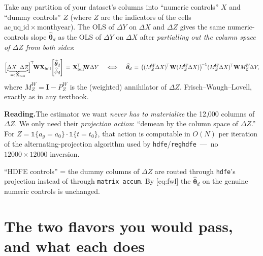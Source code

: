 \documentclass[11pt]{article}
\newcommand{\code}[1]{\texttt{\small #1}}
\newcommand{\1}{\mathbb{1}}
\newcommand{\thetad}{\widehat{\bm{\theta}}_d}
\newcommand{\Pproj}{P^{\!W}}
\newcommand{\Mproj}{M^{\!W}}
\begin{document}
Take any partition of your dataset's columns into ``numeric controls'' $X$
and ``dummy controls'' $Z$ (where $Z$ are the indicators of the cells
$\mathrm{ac\_uq\_id}\times \mathrm{monthyear}$). The OLS of $\Delta Y$ on
$\Delta X$ and $\Delta Z$ gives the same numeric-controls slope $\thetad$ as
the OLS of $\Delta Y$ on $\Delta X$ after \emph{partialling out the column
space of $\Delta Z$ from both sides}:

\begin{equation}
\Bigl[\underbrace{\Delta X\;\;\Delta Z}_{=:\,\mathbf{X}_{\text{full}}}\Bigr]^{\!\top}\!
\mathbf{W}
\mathbf{X}_{\text{full}}\!
\begin{bmatrix}\thetad \\ \widehat{\phi}_d\end{bmatrix}
\,=\, \mathbf{X}_{\text{full}}^{\!\top}\!\mathbf{W}\Delta Y
\quad\iff\quad
\thetad \,=\, \bigl((\Mproj_{Z}\!\Delta X)^{\!\top}\mathbf{W}(\Mproj_{Z}\!\Delta X)\bigr)^{\!-1}
(\Mproj_{Z}\!\Delta X)^{\!\top}\mathbf{W}\Mproj_{Z}\!\Delta Y,
\label{eq:fwl}
\end{equation}
where $\Mproj_{Z} = \mathbf{I} - \Pproj_Z$ is the (weighted) annihilator of
$\Delta Z$. Frisch--Waugh--Lovell, exactly as in any textbook.

\medskip\noindent
\textbf{Reading.}\;The estimator we want \emph{never has to materialize}
the 12{,}000 columns of $\Delta Z$. We only need their \emph{projection
action}: ``demean by the column space of $\Delta Z$.'' For
$Z = \1\{a_g = a_0\}\cdot \1\{t = t_0\}$, that action is computable in
$O(N)$ per iteration of the alternating-projection algorithm used by
\code{hdfe}/\code{reghdfe} \,---\, no $12000\times 12000$ inversion.

\begin{tcolorbox}[colback=codebg, colframe=ok, boxrule=0.6pt, arc=1pt,
                  title=\textcolor{ok}{\textbf{What the fast path is, in one line}}]
``HDFE controls'' = the dummy columns of $\Delta Z$ are routed through
\code{hdfe}'s projection instead of through \code{matrix accum}. By
\eqref{eq:fwl} the $\thetad$ on the genuine numeric controls is unchanged.
\end{tcolorbox}

\section{The two flavors you would pass, and what each does}
\end{document}
